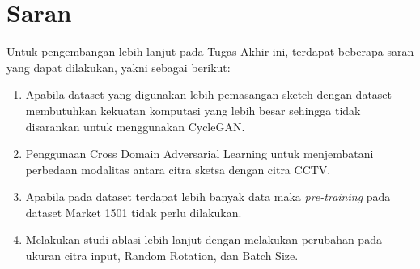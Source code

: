 \section{Saran}
\label{chap:saran}

Untuk pengembangan lebih lanjut pada Tugas Akhir ini, terdapat beberapa saran yang dapat dilakukan, yakni sebagai berikut: 

\begin{enumerate}[nolistsep]

  \item Apabila dataset yang digunakan lebih pemasangan sketch dengan dataset membutuhkan kekuatan komputasi yang lebih besar sehingga tidak disarankan untuk menggunakan CycleGAN.
  
  \item Penggunaan Cross Domain Adversarial Learning untuk menjembatani perbedaan modalitas antara citra sketsa dengan citra CCTV.

  \item Apabila pada dataset  terdapat lebih banyak data maka \textit{pre-training} pada dataset Market 1501 tidak perlu dilakukan.

  \item Melakukan studi ablasi lebih lanjut dengan melakukan perubahan pada ukuran citra input, Random Rotation, dan Batch Size.

\end{enumerate}
